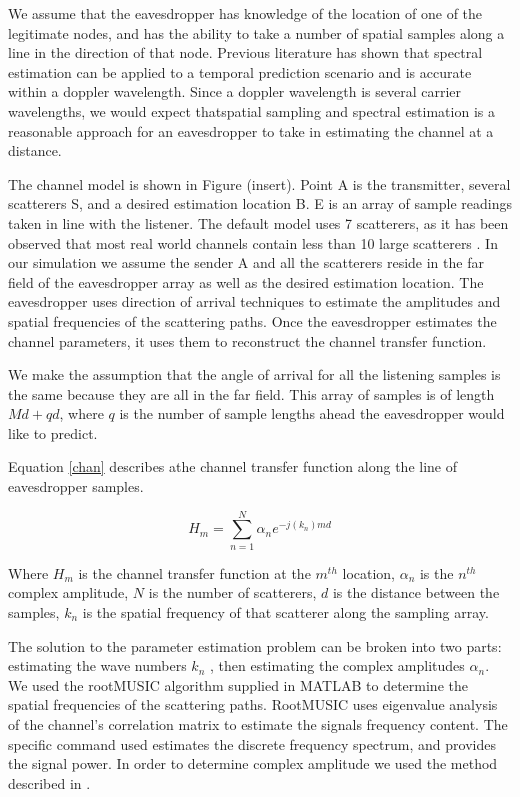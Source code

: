\documentclass{allertonproc}
\begin{document}
We assume that the eavesdropper has knowledge of the location of one of the legitimate nodes, and has the ability to take a number of spatial samples along a line in the direction of that node.  Previous literature \cite{duel-hallen2007} has shown that spectral estimation can be applied to a temporal prediction scenario and is accurate within a doppler wavelength. Since a doppler wavelength is several carrier wavelengths, we would expect thatspatial sampling and spectral estimation is a reasonable approach for an eavesdropper to take in estimating the channel at a distance. 

The channel model is shown in Figure (insert). Point A is the transmitter, several scatterers S, and a desired estimation location B. E is an array of sample readings taken in line with the listener. The default model uses 7 scatterers, as it has been observed that most real world channels contain less than 10 large scatterers \cite{duel-hallen2000}. In our simulation we assume the sender A and all the scatterers reside in the far field of the eavesdropper array as well as the desired estimation location. The eavesdropper uses direction of arrival techniques to estimate the amplitudes and spatial frequencies of the scattering paths. Once the eavesdropper estimates the channel parameters, it uses them to reconstruct the channel transfer function.

We make the assumption that the angle of arrival for all the listening samples is the same because they are all in the far field. This array of samples is of length $Md+qd$, where $q$ is the number of sample lengths ahead the eavesdropper would like to predict. 

Equation \ref{chan} describes athe channel transfer function along the line of eavesdropper samples.

\begin{equation}\label{chan}
H_m= \sum_{n=1}^N \alpha_n e^{-j(k_n)md}
\end{equation}

 Where $H_m$ is the channel transfer function at the $m^{th}$ location, $\alpha_n$ is the $n^{th}$ complex amplitude, $N$ is the number of scatterers, $d$ is the distance between the samples, $k_n$ is the spatial frequency of that scatterer along the sampling array.  

The solution to the parameter estimation problem can be broken into two parts: estimating the wave numbers $k_n$ , then estimating the complex amplitudes $\alpha_n$. We used the rootMUSIC algorithm supplied in MATLAB to determine the spatial frequencies of the scattering paths. RootMUSIC uses eigenvalue analysis of the channel's correlation matrix to estimate the signals frequency content. The specific command used estimates the discrete frequency spectrum, and provides the signal power.  In order to determine complex amplitude we used the method described in \cite{andersen1999} . 
\end{document}
